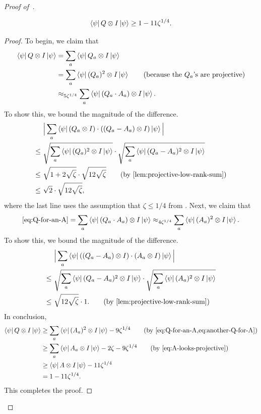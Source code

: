 \begin{proof}[Proof of~]
\begin{lemma}[Completeness of~$Q$]\label{lem:Q-completeness}
\begin{equation*}
\bra{\psi} Q \otimes I \ket{\psi}
\geq 1 - 11 \zeta^{1/4}.
\end{equation*}
\end{lemma}
\begin{proof}
To begin, we claim that
\begin{align}
\bra{\psi} Q \otimes I \ket{\psi}
& = \sum_a \bra{\psi} Q_a \otimes I \ket{\psi}\nonumber\\
& = \sum_a \bra{\psi} (Q_a)^2 \otimes I \ket{\psi}\tag{because the $Q_a$'s are projective}\\
& \approx_{5 \zeta^{1/4}} \sum_a \bra{\psi} (Q_a \cdot A_a) \otimes I \ket{\psi}. \label{eq:Q-for-an-A}
\end{align}
To show this, we bound the magnitude of the difference.
\begin{align*}
&\Big|\sum_a \bra{\psi} (Q_a \otimes I) \cdot ((Q_a - A_a) \otimes I) \ket{\psi}\Big|\\
\leq~&\sqrt{\sum_a\bra{\psi} (Q_a)^2 \otimes I \ket{\psi}}
	\cdot \sqrt{\sum_a \bra{\psi} (Q_a - A_a)^2 \otimes I \ket{\psi}}\\
\leq~&  \sqrt{1+2\sqrt{\zeta}} \cdot \sqrt{12\sqrt{\zeta}} \tag{by \Cref{lem:projective-low-rank-sum}}\\
\leq~& \sqrt{2} \cdot \sqrt{12\sqrt{\zeta}},
\end{align*}
where the last line uses the assumption that $\zeta \leq 1/4$ from .
Next, we claim that
\begin{equation}\label{eq:another-Q-for-A}
\eqref{eq:Q-for-an-A}
= \sum_a \bra{\psi} (Q_a \cdot A_a) \otimes I \ket{\psi}
\approx_{4 \zeta^{1/4}} \sum_a \bra{\psi} (A_a)^2 \otimes I \ket{\psi}.
\end{equation}
To show this, we bound the magnitude of the difference.
\begin{align*}
&\Big|\sum_a \bra{\psi} ((Q_a - A_a) \otimes I) \cdot (A_a \otimes I) \ket{\psi}\Big|\\
\leq~&\sqrt{\sum_a \bra{\psi} (Q_a - A_a)^2 \otimes I \ket{\psi}}
	\cdot \sqrt{\sum_a\bra{\psi} (A_a)^2 \otimes I \ket{\psi}}\\
\leq~& \sqrt{12 \sqrt{\zeta}} \cdot 1. \tag{by \Cref{lem:projective-low-rank-sum}}
\end{align*}
In conclusion,
\begin{align*}
\bra{\psi} Q \otimes I \ket{\psi}
& \geq \sum_a \bra{\psi} (A_a)^2 \otimes I \ket{\psi} - 9 \zeta^{1/4} \tag{by \Cref{eq:Q-for-an-A,eq:another-Q-for-A}}\\
& \geq \sum_a \bra{\psi} A_a \otimes I \ket{\psi} - 2\zeta - 9\zeta^{1/4} \tag{by \Cref{eq:A-looks-projective}}\\
& \geq \bra{\psi} A \otimes I \ket{\psi} - 11 \zeta^{1/4} \nonumber\\
& = 1 - 11 \zeta^{1/4}.
\end{align*}
This completes the proof.
\end{proof}


\end{proof}
